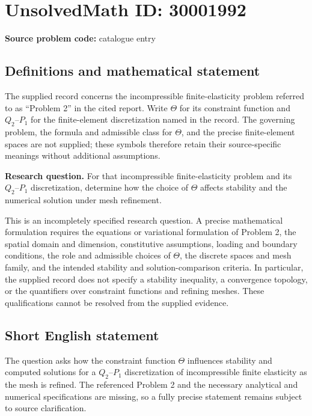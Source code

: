 \documentclass[11pt]{article}
\begin{document}
\section*{UnsolvedMath ID: 30001992}
\textbf{Source problem code:} catalogue entry
\subsection{Definitions and mathematical statement}
The supplied record concerns the incompressible finite-elasticity problem referred to as ``Problem 2'' in the cited report. Write \(\Theta\) for its constraint function and \(Q_2\text{--}P_1\) for the finite-element discretization named in the record. The governing problem, the formula and admissible class for \(\Theta\), and the precise finite-element spaces are not supplied; these symbols therefore retain their source-specific meanings without additional assumptions.

\textbf{Research question.} For that incompressible finite-elasticity problem and its \(Q_2\text{--}P_1\) discretization, determine how the choice of \(\Theta\) affects stability and the numerical solution under mesh refinement.

This is an incompletely specified research question. A precise mathematical formulation requires the equations or variational formulation of Problem 2, the spatial domain and dimension, constitutive assumptions, loading and boundary conditions, the role and admissible choices of \(\Theta\), the discrete spaces and mesh family, and the intended stability and solution-comparison criteria. In particular, the supplied record does not specify a stability inequality, a convergence topology, or the quantifiers over constraint functions and refining meshes. These qualifications cannot be resolved from the supplied evidence.
\subsection{Short English statement}
The question asks how the constraint function \(\Theta\) influences stability and computed solutions for a \(Q_2\text{--}P_1\) discretization of incompressible finite elasticity as the mesh is refined. The referenced Problem 2 and the necessary analytical and numerical specifications are missing, so a fully precise statement remains subject to source clarification.
\end{document}
